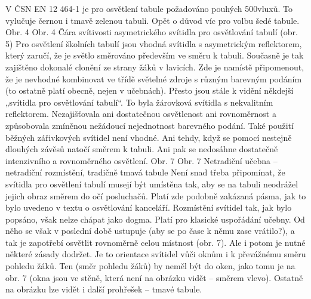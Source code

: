 \medskip
V ČSN EN 12 464-1 je pro osvětlení tabule požadováno pouhých 500vluxů. To vylučuje černou i tmavě zelenou tabuli. Opět o důvod víc pro volbu šedé tabule.
Obr. 4
Obr. 4 Čára svítivosti asymetrického svítidla pro osvětlování tabulí (obr. 5)
\medskip
Pro osvětlení školních tabulí jsou vhodná svítidla s asymetrickým reflektorem, který zaručí, že je světlo směrováno především ve směru k tabuli. Současně je tak zajištěno dokonalé clonění ze strany žáků v lavicích.
\medskip
Zde je namístě připomenout, že je nevhodné kombinovat ve třídě světelné zdroje s různým barevným podáním (to ostatně platí obecně, nejen v učebnách). Přesto jsou stále k vidění někdejší „svítidla pro osvětlování tabulí“. To byla žárovková svítidla s nekvalitním reflektorem. Nezajišťovala ani dostatečnou osvětlenost ani rovnoměrnost a způsobovala zmíněnou nežádoucí nejednotnost barevného podání.
\medskip
Také použití běžných zářivkových svítidel není vhodné. Ani tehdy, když se pomocí nestejně dlouhých závěsů natočí směrem k tabuli. Ani pak se nedosáhne dostatečně intenzivního a rovnoměrného osvětlení.
Obr. 7
Obr. 7 Netradiční učebna – netradiční rozmístění, tradičně tmavá tabule
\medskip
Není snad třeba připomínat, že svítidla pro osvětlení tabulí musejí být umístěna tak, aby se na tabuli neodrážel jejich obraz směrem do očí posluchačů. Platí zde podobně zakázaná pásma, jak to bylo uvedeno v textu o osvětlování kanceláří.
\medskip
Rozmístění svítidel tak, jak bylo popsáno, však nelze chápat jako dogma. Platí pro klasické uspořádání učebny. Od něho se však v poslední době ustupuje (aby se po čase k němu zase vrátilo?), a tak je zapotřebí osvětlit rovnoměrně celou místnost (obr. 7).
\medskip
Ale i potom je nutné některé zásady dodržet. Je to orientace svítidel vůči oknům i k převážnému směru pohledu žáků. Ten (směr pohledu žáků) by neměl být do oken, jako tomu je na obr. 7 (okna jsou ve stěně, která není na obrázku vidět – směrem vlevo). Ostatně na obrázku lze vidět i další prohřešek – tmavé tabule.